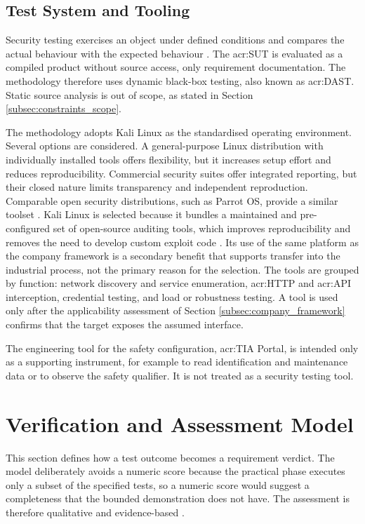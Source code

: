 \subsection{Test System and Tooling} 
\label{subsec:execution_tooling} 

Security testing exercises an object under defined conditions and compares the actual behaviour with the expected behaviour \cite[p. ES-1]{nist_sp800_115}. The \gls{acr:SUT} is evaluated as a compiled product without source access, only requirement documentation. The methodology therefore uses dynamic black-box testing, also known as \gls{acr:DAST}. Static source analysis is out of scope, as stated in Section \ref{subsec:constraints_scope}. 

The methodology adopts Kali Linux as the standardised operating environment. Several options are considered. A general-purpose Linux distribution with individually installed tools offers flexibility, but it increases setup effort and reduces reproducibility. Commercial security suites offer integrated reporting, but their closed nature limits transparency and independent reproduction. Comparable open security distributions, such as Parrot OS, provide a similar toolset \cite{gfg_kali_alternatives_2024}. Kali Linux is selected because it bundles a maintained and pre-configured set of open-source auditing tools, which improves reproducibility and removes the need to develop custom exploit code \cite{kali_whatis}. Its use of the same platform as the company framework is a secondary benefit that supports transfer into the industrial process, not the primary reason for the selection. The tools are grouped by function: network discovery and service enumeration, \gls{acr:HTTP} and \gls{acr:API} interception, credential testing, and load or robustness testing. A tool is used only after the applicability assessment of Section \ref{subsec:company_framework} confirms that the target exposes the assumed interface. 

The engineering tool for the safety configuration, \gls{acr:TIA} Portal, is intended only as a supporting instrument, for example to read identification and maintenance data or to observe the safety qualifier. It is not treated as a security testing tool.




\section{Verification and Assessment Model} 
\label{sec:evaluation_metrics} 
This section defines how a test outcome becomes a requirement verdict. The model deliberately avoids a numeric score because the practical phase executes only a subset of the specified tests, so a numeric score would suggest a completeness that the bounded demonstration does not have. The assessment is therefore qualitative and evidence-based \cite[p. 144, 217]{Witte2019}. 

